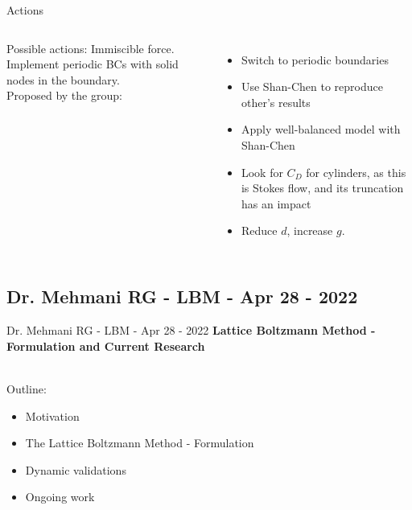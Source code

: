 \documentclass[8pt]{beamer}
\begin{document}
	\begin{frame}{Actions}
		\begin{columns}[T]
			
			Possible actions: Immiscible force. Implement periodic BCs with solid nodes in the boundary. ~\\
			
			Proposed by the group:
			\begin{itemize}
				\item Switch to periodic boundaries
				\item Use Shan-Chen to reproduce other's results
				\item Apply well-balanced model with Shan-Chen
				\item Look for $C_D$ for cylinders, as this is Stokes flow, and its truncation has an impact
				\item Reduce $d$, increase $g$. 
				
			\end{itemize}
			
			
		\end{columns}
	\end{frame}

	\subsection{Dr. Mehmani RG - LBM - Apr 28 - 2022}
	\label{}
	\justifying
	\begin{frame}{Dr. Mehmani RG - LBM - Apr 28 - 2022}
		\textbf{Lattice Boltzmann Method - Formulation and Current Research}
		
		~\\Outline:
		\begin{itemize}
			\item Motivation
			\item The Lattice Boltzmann Method - Formulation
			\item Dynamic validations
			\item Ongoing work
		\end{itemize}
	\end{frame}
	
\end{document}
